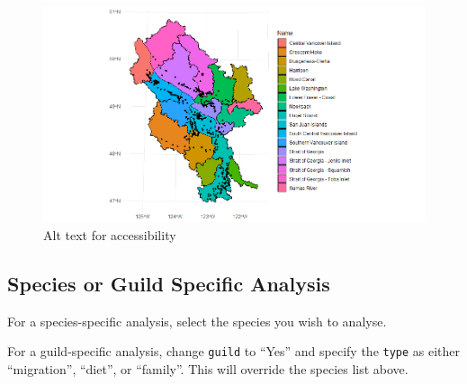 \documentclass[
  letterpaper,
  DIV=11,
  numbers=noendperiod]{scrreprt}
\newenvironment{Shaded}{\begin{snugshade}}{\end{snugshade}}
\newcommand{\CommentTok}[1]{\textcolor[rgb]{0.37,0.37,0.37}{#1}}
\newcommand{\FunctionTok}[1]{\textcolor[rgb]{0.28,0.35,0.67}{#1}}
\newcommand{\NormalTok}[1]{\textcolor[rgb]{0.00,0.23,0.31}{#1}}
\newcommand{\OtherTok}[1]{\textcolor[rgb]{0.00,0.23,0.31}{#1}}
\newcommand{\SpecialCharTok}[1]{\textcolor[rgb]{0.37,0.37,0.37}{#1}}
\newcommand{\StringTok}[1]{\textcolor[rgb]{0.13,0.47,0.30}{#1}}
\begin{document}
\begin{figure}[H]

{\centering \includegraphics{Images/WatershedSampleMap.png}

}

\caption{Alt text for accessibility}

\end{figure}%

\subsection{Species or Guild Specific Analysis}\label{3.1.2Analysis}

For a species-specific analysis, select the species you wish to analyse.

\begin{Shaded}
\end{Shaded}

For a guild-specific analysis, change \texttt{guild} to ``Yes'' and
specify the \texttt{type} as either ``migration'', ``diet'', or
``family''. This will override the species list above.
\end{document}
